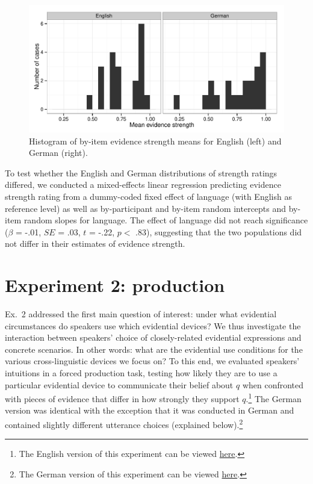 \documentclass[11pt]{article}
\begin{document}
\begin{figure}
\centering
\includegraphics[width=.9\textwidth]{pics/evidencestrength-histograms}
\caption{Histogram of by-item evidence strength means  for English (left) and German (right).}
\label{fig:evidencestrength}
\end{figure}


To test whether the English and German distributions of strength ratings differed, we conducted a mixed-effects linear regression predicting evidence strength rating from a dummy-coded fixed effect of language (with English as reference level) as well as by-participant and by-item random intercepts and by-item random slopes for language. The effect of language did not reach significance ($\beta$ = -.01, $SE$ = .03, $t$ = -.22, $p <$ .83), suggesting that the two populations did not differ in their estimates of evidence strength.   

\section{Experiment 2: production}


Ex.~2 addressed the first main question of interest: under what evidential circumstances do speakers use which evidential devices? We thus investigate the interaction between speakers’ choice of closely-related evidential expressions and concrete scenarios. In other words: what are the evidential use conditions for the various cross-linguistic devices we focus on? To this end, we evaluated speakers' intuitions in a forced production task, testing how likely they are to use a particular evidential device to communicate their belief about $q$ when confronted with pieces of evidence that differ in how strongly they support $q$.\footnote{The English version of this experiment can be viewed \href{http://stanford.edu/~jdegen/71_modals_forced_production/modals.html}{here}.} The German version was identical with the exception that it was conducted in German and contained slightly different utterance choices (explained below).\footnote{The German version of this experiment can be viewed \href{http://web.stanford.edu/~jdegen/cgi-bin/3_dp_production/modals.html}{here}.}
\end{document}
